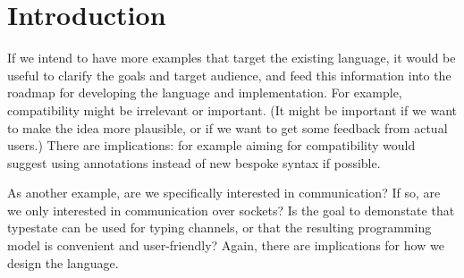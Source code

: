 \section{Introduction}

If we intend to have more examples that target the existing language,
it would be useful to clarify the goals and target audience, and feed
this information into the roadmap for developing the language and
implementation. For example, compatibility might be irrelevant or
important. (It might be important if we want to make the idea more
plausible, or if we want to get some feedback from actual users.)
There are implications: for example aiming for compatibility would
suggest using annotations instead of new bespoke syntax if possible.

As another example, are we specifically interested in communication?
If so, are we only interested in communication over sockets? Is the
goal to demonstate that typestate can be used for typing channels, or
that the resulting programming model is convenient and user-friendly?
Again, there are implications for how we design the language.
